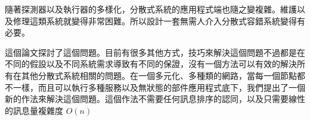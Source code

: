\begin{abstractCH}

\setlength{\baselineskip}{1.5em}

隨著探測器以及執行器的多樣化，分散式系統的應用程式端也隨之變複雜。維護以及修理這類系統就變得非常困難。所以設計一套無需人介入分散式容錯系統變得有必要。

這個論文探討了這個問題。目前有很多其他方式，技巧來解決這個問題不過都是在不同的假設以及不同系統需求導致有不同的保證，沒有一個方法可以有效的解決所有在其他分散式系統相關的問題。在一個多元化、多種類的網路，當每一個節點都不一樣，而且可以執行多種服務以及無狀態的部件應用程式底下，我們提出了一個新的作法來解決這個問題。這個作法不需要任何訊息排序的認同，以及只需要線性的訊息量複雜度 $O(n)$

\end{abstractCH}
